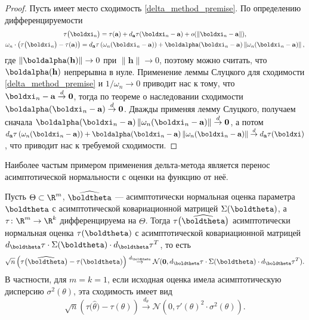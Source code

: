 \begin{proof}
    Пусть имеет место сходимость \eqref{delta_method_premise}. По определению дифференцируемости
    \begin{gather*}
    	\tau\bigl(\boldxi_n\bigr) = \tau(\mathbf{a}) + d_{\mathbf{a}}\tau(\boldxi_n - \mathbf{a}) + o(\|\boldxi_n - \mathbf{a}\|),\\
        \omega_n\cdot\left(\tau\bigl(\boldxi_n\bigr) - \tau(\mathbf{a})\right) = d_{\mathbf{a}}\tau\left(\omega_n(\boldxi_n - \mathbf{a})\right) + \boldalpha(\boldxi_n - \mathbf{a}) \left\|\omega_n(\boldxi_n - \mathbf{a})\right\|,
    \end{gather*}
    где $\|\boldalpha(\mathbf h)\| \to 0$ при $\|\mathbf h\| \to 0$, поэтому можно считать, что $\boldalpha(\mathbf h)$ непрерывна в нуле. Применение леммы Слуцкого для сходимости \eqref{delta_method_premise} и $1/\omega_n \to 0$ приводит нас к тому, что $\boldxi_n - \mathbf{a} \stackrel{d}{\to} \mathbf{0}$, тогда по теореме о наследовании сходимости $\boldalpha(\boldxi_n - \mathbf{a}) \stackrel{d}{\to} \mathbf{0}$. Дважды применяя лемму Слуцкого, получаем сначала $\boldalpha(\boldxi_n - \mathbf{a}) \left\|\omega_n(\boldxi_n - \mathbf{a})\right\| \stackrel{d}{\to} \mathbf{0}$, а потом $d_{\mathbf{a}}\tau\left(\omega_n(\boldxi_n - \mathbf{a})\right) + \boldalpha(\boldxi_n - \mathbf{a}) \left\|\omega_n(\boldxi_n - \mathbf{a})\right\| \stackrel{d}{\to} d_{\mathbf a}\tau(\boldxi)$, что приводит нас к требуемой сходимости.
\end{proof}

Наиболее частым примером применения дельта-метода является перенос асимптотической нормальности с оценки на функцию от неё.

\begin{corollary*}\label{safe_norm}
    Пусть $\Theta \subset \R^m$, $\widehat{\boldtheta}$ --- асимптотически нормальная оценка параметра $\boldtheta$ с асимптотической ковариационной матрицей $\Sigma(\boldtheta)$, а $\tau\colon \R^m \to \R^k$ дифференцируема на $\Theta$. Тогда $\tau\bigl(\widehat{\boldtheta}\bigr)$ асимптотически нормальная оценка $\tau(\boldtheta)$ с асимптотической ковариационной матрицей $d_{\boldtheta}\tau \cdot \Sigma(\boldtheta) \cdot d_{\boldtheta}\tau^T$, то есть
    \[
    \sqrt{n}\left(\tau\bigl(\widehat{\boldtheta}\bigr) - \tau(\boldtheta)\right) \stackrel{d_{\boldtheta}}{\to} \mathcal{N}(\mathbf 0, d_{\boldtheta}\tau \cdot \Sigma(\boldtheta) \cdot d_{\boldtheta}\tau^T).
    \]
    В частности, для $m = k = 1$, если исходная оценка имела асимптотическую дисперсию $\sigma^2(\theta)$, эта сходимость имеет вид
    \[
    \sqrt{n}\left(\tau\bigl(\widehat{\theta}\bigr) - \tau(\theta)\right) \stackrel{d_{\theta}}{\to} \mathcal{N}(0, \tau'(\theta)^2\cdot \sigma^2(\theta)).
    \]
\end{corollary*}

